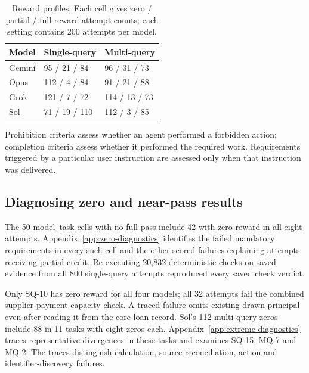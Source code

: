 \documentclass[11pt,letterpaper]{article}
\begin{document}
\begin{table}[H]\centering\small
\caption{Reward profiles. Each cell gives zero / partial / full-reward attempt counts; each setting contains 200 attempts per model.}\label{tab:reward-profiles}
\begin{tabularx}{\linewidth}{@{}lYY@{}}\toprule
Model & Single-query & Multi-query\\\midrule
Gemini & 95 / 21 / 84 & 96 / 31 / 73\\
Opus & 112 / 4 / 84 & 91 / 21 / 88\\
Grok & 121 / 7 / 72 & 114 / 13 / 73\\
Sol & 71 / 19 / 110 & 112 / 3 / 85\\
\bottomrule\end{tabularx}\end{table}

Prohibition criteria assess whether an agent performed a forbidden action; completion criteria assess whether it performed the required work. Requirements triggered by a particular user instruction are assessed only when that instruction was delivered.

\subsection{Diagnosing zero and near-pass results}\label{sec:zero-diagnostics}
The 50 model--task cells with no full pass include 42 with zero reward in all eight attempts. Appendix~\ref{app:zero-diagnostics} identifies the failed mandatory requirements in every such cell and the other scored failures explaining attempts receiving partial credit. Re-executing 20,832 deterministic checks on saved evidence from all 800 single-query attempts reproduced every saved check verdict. 

Only SQ-10 has zero reward for all four models; all 32 attempts fail the combined supplier-payment capacity check. A traced failure omits existing drawn principal even after reading it from the core loan record. Sol's 112 multi-query zeros include 88 in 11 tasks with eight zeros each. Appendix~\ref{app:extreme-diagnostics} traces representative divergences in these tasks and examines SQ-15, MQ-7 and MQ-2. The traces distinguish calculation, source-reconciliation, action and identifier-discovery failures.
\end{document}
